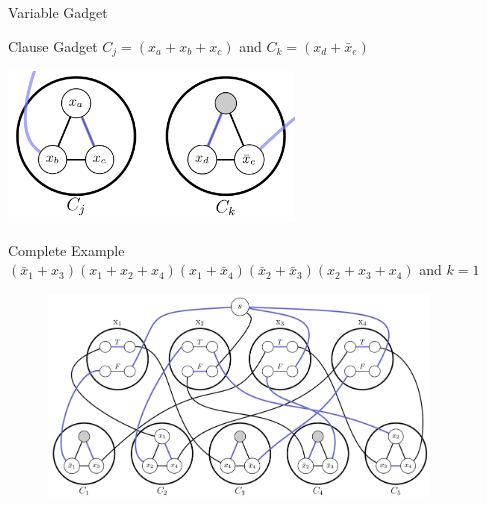 \begin{frame}{Variable Gadget}
    \begin{minipage}{\linewidth}
        \centering
    \end{minipage}
\end{frame}

\begin{frame}{Clause Gadget}
    \centering
    $C_j = (x_a + x_b + x_c)$ and $C_k = (x_d + \bar x_e)$
    \bigbreak
    \begin{minipage}{\linewidth}
        \centering
        \includegraphics[height=4cm]{images/reduction/clause.png}
    \end{minipage}
\end{frame}

\begin{frame}{Complete Example}
    \centering
    $(\bar{x}_1 + x_3)(x_1 + x_2 + x_4)(x_1 + \bar{x}_4)(\bar{x}_2 + \bar{x}_3)(x_2 + x_3 + x_4)$ and $k=1$
    \begin{figure}
        \centering
        \includegraphics[width=0.9\textwidth]{images/reduction/full.png}
    \end{figure}
\end{frame}
